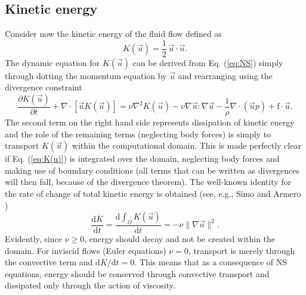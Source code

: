 
\subsection{Kinetic energy}
\label{sec:kinetic}
Consider now the kinetic energy of the fluid flow defined as 
\begin{equation}
 K(\vec{u})=\frac{1}{2}\, \vec{u}\cdot \vec{u}. \label{eq:K}
\end{equation}
The dynamic equation for $K(\vec{u})$ can be derived from Eq. (\ref{eq:NS}) simply through dotting the momentum equation by $\vec{u}$ and rearranging using the divergence constraint
\begin{equation}
 \frac{\partial K(\vec{u})}{\partial t} + \nabla \cdot [\vec{u}K(\vec{u})] = \nu \nabla^2 K(\vec{u}) -\nu \nabla \vec{u} : \nabla \vec{u} - \frac{1}{\rho}\nabla \cdot \left(\vec{u}p \right) +\text{f}\cdot \vec{u}. 
 \label{eq:K(u)}
\end{equation}
The second term on the right hand side represents dissipation of kinetic energy and the role of the remaining terms (neglecting body forces) is simply to transport $K(\vec{u})$ within the computational domain. This is made perfectly clear if Eq. (\ref{eq:K(u)}) is integrated over the domain, neglecting body forces and making use of boundary conditions (all terms that can be written as divergences will then fall, because of the divergence theorem). The well-known identity for the rate of change of total kinetic energy is obtained (see, e.g., Simo and Armero \cite{simo94})
\begin{equation}
 \frac{\text{d} \overline{K} }{\text{d} t} = \frac{\text{d} \int_{\Omega} K(\vec{u})}{\text{d} t} = - \nu \| \nabla \vec{u} \|^2.
\end{equation}
Evidently, since $\nu \ge 0$, energy should decay and not be created within the domain. For inviscid flows (Euler equations) $\nu=0$, transport is merely through the convective term and $\text{d} \overline{K}/\text{d} t = 0$. This means that as a consequence of NS equations, energy should be conserved through convective transport and dissipated only through the action of viscosity.
